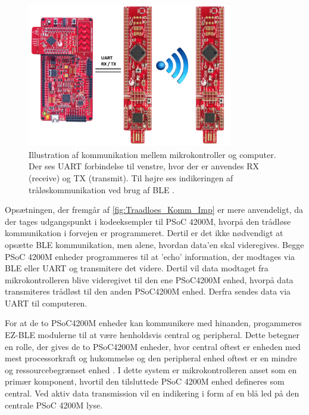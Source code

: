 \begin{figure}[H]
	\centering
	\includegraphics[width=0.8\textwidth]{figures/Traadloes_Komm_Imp}
	\caption{Illustration af kommunikation mellem mikrokontroller og computer. Der ses UART forbindelse til venstre, hvor der er anvendes RX (receive) og TX (transmit). Til højre ses indikeringen af tråløskommunikation ved brug af BLE \citep{cypresspsoc2015, cypresspsoc42015}.} 
	\label{fig:Traadloes_Komm_Imp}
\end{figure}

\noindent
Opsætningen, der fremgår af \autoref{fig:Traadloes_Komm_Imp} er mere anvendeligt, da der tages udgangspunkt i kodeeksempler til PSoC 4200M, hvorpå den trådløse kommunikation i forvejen er programmeret. Dertil er det ikke nødvendigt at opsætte BLE kommunikation, men alene, hvordan data'en skal videregives. 
Begge PSoC 4200M enheder programmeres til at 'echo' information, der modtages via BLE eller UART og transmitere det videre. Dertil vil data modtaget fra mikrokontrolleren blive videregivet til den ene PSoC4200M enhed, hvorpå data transmiteres trådløst til den anden PSoC4200M enhed. Derfra sendes data via UART til computeren. 

For at de to PSoC4200M enheder kan kommunikere med hinanden, progammeres EZ-BLE modulerne til at være henholdsvis central og peripheral. Dette betegner en rolle, der gives de to PSoC4200M enheder, hvor central oftest er enheden med mest processorkraft og hukommelse og den peripheral enhed oftest er en mindre og ressourcebegrænset enhed \citep{townsend2014}. I dette system er mikrokontrolleren anset som en primær komponent, hvortil den tilsluttede PSoC 4200M enhed defineres som central. Ved aktiv data transmission vil en indikering i form af en blå led på den centrale PSoC 4200M lyse.